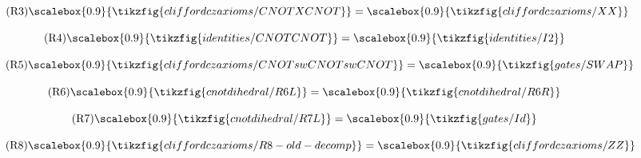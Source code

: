 \begin{figure}[ht]
{\begin{minipage}{0.98\textwidth}
\begin{minipage}[c]{0.31\textwidth}
            \begin{equation}\tag{R3}\label{cnot-old-R3}
            \scalebox{0.9}{\tikzfig{cliffordczaxioms/CNOTXCNOT}}
            =
            \scalebox{0.9}{\tikzfig{cliffordczaxioms/XX}}
            \end{equation}
        \end{minipage}
        \begin{minipage}[c]{0.29\textwidth}
            \centering
            \begin{equation}\tag{R4}\label{cnot-old-R4}
            \scalebox{0.9}{\tikzfig{identities/CNOTCNOT}}
            =
            \scalebox{0.9}{\tikzfig{identities/I2}}
            \end{equation}
        \end{minipage}
        \begin{minipage}[c]{0.47\textwidth}
            \centering
            \begin{equation}\tag{R5}\label{cnot-old-R5}
            \scalebox{0.9}{\tikzfig{cliffordczaxioms/CNOTswCNOTswCNOT}}
            =
            \scalebox{0.9}{\tikzfig{gates/SWAP}}
            \end{equation}
        \end{minipage}
        \begin{minipage}[c]{0.36\textwidth}
            \centering
            \begin{equation}\tag{R6}
            \scalebox{0.9}{\tikzfig{cnotdihedral/R6L}}
            =
            \scalebox{0.9}{\tikzfig{cnotdihedral/R6R}}
            \end{equation}
        \end{minipage}
        \begin{minipage}[c]{0.28\textwidth}
            \centering
            \begin{equation}\tag{R7}
            \scalebox{0.9}{\tikzfig{cnotdihedral/R7L}}
            =
            \scalebox{0.9}{\tikzfig{gates/Id}}
            \end{equation}
        \end{minipage}
        \begin{minipage}[c]{0.36\textwidth}
            \centering
            \begin{equation}\tag{R8}\label{cnot-old-R8}
            \scalebox{0.9}{\tikzfig{cliffordczaxioms/R8-old-decomp}}
            =
            \scalebox{0.9}{\tikzfig{cliffordczaxioms/ZZ}}
            \end{equation}
        \end{minipage}

\end{minipage}}
\end{figure}
